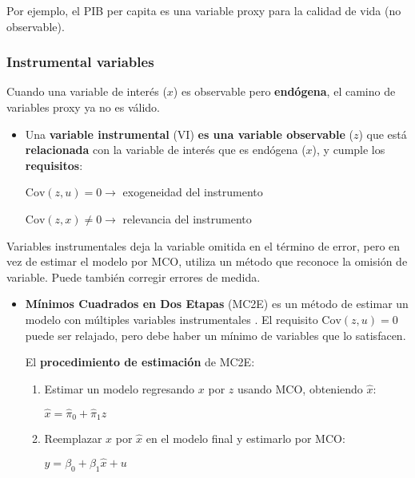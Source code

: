 \documentclass[10pt, a4paper, landscape]{extarticle}
\newcommand{\Cov}{\mathrm{Cov}}
\begin{document}
\begin{multicols}{3}
Por ejemplo, el PIB per capita es una variable proxy para la calidad de vida (no observable).

\subsubsection*{Instrumental variables}

Cuando una variable de interés ($x$) es observable pero \textbf{endógena}, el camino de variables proxy ya no es válido.

\begin{itemize}[leftmargin=*]
	\item Una \textbf{variable instrumental} (VI) \textbf{es una variable observable} ($z$) que está \textbf{relacionada} con la variable de interés que es endógena ($x$), y cumple los \textbf{requisitos}:
	\begin{center}
		$\Cov(z, u) = 0 \rightarrow$ exogeneidad del instrumento
		
		$\Cov(z, x) \neq 0 \rightarrow$ relevancia del instrumento
	\end{center}
\end{itemize}

Variables instrumentales deja la variable omitida en el término de error, pero en vez de estimar el modelo por MCO, utiliza un método que reconoce la omisión de variable. Puede también corregir errores de medida.

\begin{itemize}[leftmargin=*]
	\item \textbf{Mínimos Cuadrados en Dos Etapas} (MC2E) es un método de estimar un modelo con múltiples variables instrumentales . El requisito $\Cov(z,u) = 0$ puede ser relajado, pero debe haber un mínimo de variables que lo satisfacen.

	El \textbf{procedimiento de estimación} de MC2E:
	\begin{enumerate}[leftmargin=*]
		\item Estimar un modelo regresando $x$ por $z$ usando MCO, obteniendo $\hat{x}$:
		\begin{center}
			$\hat{x} = \hat{\pi}_0 + \hat{\pi}_1 z$
		\end{center}
		\item Reemplazar $x$ por $\hat{x}$ en el modelo final y estimarlo por MCO:
		\begin{center}
			$y = \beta_0 + \beta_1 \hat{x} + u$
		\end{center}
	\end{enumerate}


\end{itemize}
\end{multicols}
\end{document}
